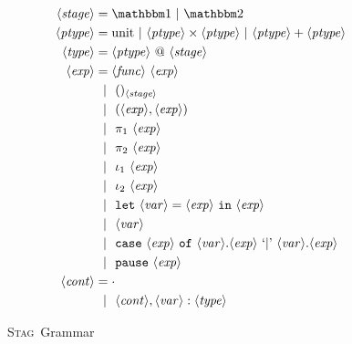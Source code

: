 \documentclass[11pt]{article}
\makeatletter
\newcommand {\stage} {\langle\mathit{stage}\rangle}
\newcommand {\ptype} {\langle\mathit{ptype}\rangle}
\newcommand {\type} {\langle\mathit{type}\rangle}
\newcommand {\expr} {\langle\mathit{exp}\rangle}
\newcommand {\var} {\langle\mathit{var}\rangle}
\newcommand {\context} {\langle\mathit{cont}\rangle}
\newcommand {\gbar} {~~|~~}
\newcommand {\bbone} {\mathbbm 1}
\newcommand {\bbtwo} {\mathbbm 2}
\newcommand {\at} {{\tt~@~}}
\newcommand {\pause} {{\tt pause}}
\newcommand {\letin} [3] {{\tt let}~{#1} = {#2}~{\tt in}~{#3}}
\newcommand {\wstage} {\textsc{Stag}}
\makeatother
\begin{document}
\begin{figure}
\caption{\wstage~Grammar}
\label{fig:gram2}
\centering
\begin{align*}
\stage &= \bbone~|~\bbtwo \\
\ptype &= \text{unit}~|~\ptype \times \ptype~|~\ptype + \ptype \\
\type &= \ptype \at \stage \\
\expr &= \langle\mathit{func}\rangle~\expr \\
&\gbar ()_{\stage} \\
&\gbar (\expr, \expr) \\
&\gbar \pi_1~\expr \\
&\gbar \pi_2~\expr \\
&\gbar \iota_1~\expr \\
&\gbar \iota_2~\expr \\
&\gbar \letin {\var}{\expr}{\expr} \\
&\gbar \var \\
&\gbar {\tt case}~\expr~{\tt of}~\var.\expr~`{\tt |}\text{'}~\var.\expr \\
&\gbar \pause~\expr \\
\context &= \cdot \\
&\gbar \context, \var : \type
\end{align*}
\end{figure}
\end{document}
